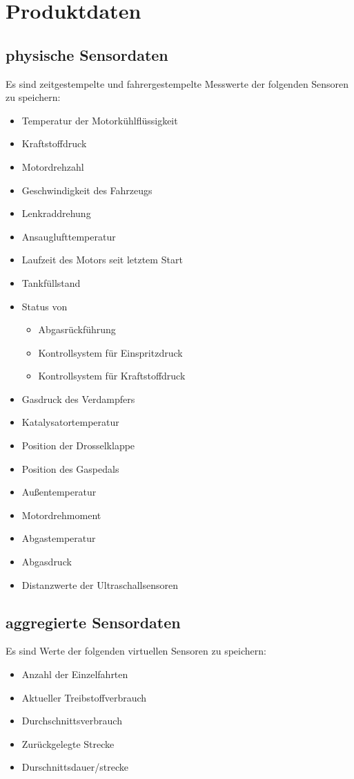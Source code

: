 \documentclass[pflichtenheft.tex]{subfiles}
\begin{document}
\chapter{Produktdaten}

\section{\mkd physische Sensordaten}
Es sind zeitgestempelte und fahrergestempelte Messwerte der folgenden Sensoren zu speichern:
\begin{itemize}
\item
Temperatur der Motorkühlflüssigkeit
\item
Kraftstoffdruck
\item
Motordrehzahl
\item
Geschwindigkeit des Fahrzeugs
\item
Lenkraddrehung
\item
Ansauglufttemperatur 
\item
Laufzeit des Motors seit letztem Start
\item
Tankfüllstand
\item
Status von
\begin{itemize}
\item Abgasrückführung
\item Kontrollsystem für Einspritzdruck
\item Kontrollsystem für Kraftstoffdruck
\end{itemize}
\item
Gasdruck des Verdampfers
\item
Katalysatortemperatur
\item
Position der Drosselklappe
\item
Position des Gaspedals
\item
Außentemperatur
\item
Motordrehmoment
\item
Abgastemperatur
\item
Abgasdruck
\item
Distanzwerte der Ultraschallsensoren

\end{itemize}

\section{\mkd aggregierte Sensordaten}
Es sind Werte der folgenden virtuellen Sensoren zu speichern:
\begin{itemize}
\item Anzahl der Einzelfahrten
\item Aktueller Treibstoffverbrauch
\item Durchschnittsverbrauch
\item Zurückgelegte Strecke
\item Durschnittsdauer/strecke

\end{itemize}
\end{document}
